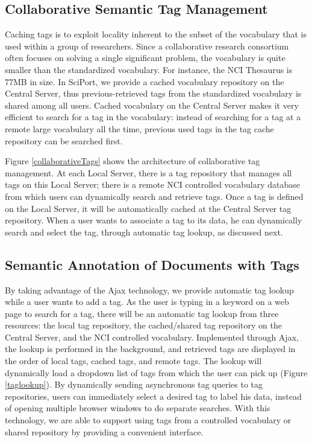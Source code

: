 \documentclass{doublecol-new}
\theoremstyle{TH}{
\newtheorem{lemma}{Lemma}
\newtheorem{theorem}[lemma]{Theorem}
\newtheorem{corrolary}[lemma]{Corrolary}
\newtheorem{conjecture}[lemma]{Conjecture}
\newtheorem{proposition}[lemma]{Proposition}
\newtheorem{claim}[lemma]{Claim}
\newtheorem{stheorem}[lemma]{Wrong Theorem}
\newtheorem{algorithm}{Algorithm}
}
\theoremstyle{THrm}{
\newtheorem{definition}{Definition}[section]
\newtheorem{question}{Question}[section]
\newtheorem{remark}{Remark}
\newtheorem{scheme}{Scheme}
}
\theoremstyle{THhit}{
\newtheorem{case}{Case}[section]
}
\begin{document}



\subsection{Collaborative Semantic Tag Management} \label{sec:coltag}

Caching tags is to exploit locality inherent to the subset of the
vocabulary that is used within a group of researchers. Since a
collaborative research consortium often focuses on solving a single
significant problem, the vocabulary is quite smaller than the
standardized vocabulary. For instance, the NCI Thesaurus
\cite{ncithesaurus} is 77MB in size.  In SciPort, we provide a
cached vocabulary repository on the Central Server, thus
previous-retrieved tags from the standardized vocabulary is shared
among all users.   Cached vocabulary on the Central Server makes it
very efficient to search for a tag in the vocabulary: instead of
searching for a tag at a remote large vocabulary all the time,
previous used tags in the tag cache repository can be searched
first.

Figure \ref{collaborativeTags} shows the architecture of
collaborative tag management. At each Local Server, there is a tag
repository that manages all tags on this Local Server; there is a
remote NCI controlled vocabulary database from which users can
dynamically search and retrieve tags. Once a tag is defined on the
Local Server, it will  be automatically cached at the Central Server
tag repository. When a user wants to associate a tag to its data, he
can dynamically search and select the tag, through automatic tag
lookup, as discussed next.

\subsection{Semantic Annotation of Documents with Tags}
By taking advantage of the Ajax technology, we provide automatic tag
lookup while a user wants to add a tag. As the user is typing in a
keyword on a web page to search for a tag, there will be an
automatic tag lookup from three resources: the local tag repository,
the cached/shared tag repository on the Central Server, and the NCI
controlled vocabulary. Implemented through Ajax, the lookup is
performed in the background, and retrieved tags are displayed in the
order of local tags, cached tags, and remote tags.  The lookup will
dynamically load a dropdown list of tags from which the user can
pick up (Figure \ref{taglookup}). By dynamically sending
asynchronous tag queries to tag repositories, users can immediately
select a desired tag to label his data, instead of opening multiple
browser windows to do separate searches.  With this technology, we
are able to support using tags from a controlled vocabulary or
shared repository by providing a convenient interface.
\end{document}
